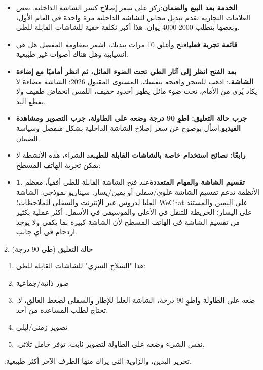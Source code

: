 \begin{itemize}
  \item \textbf{الخدمة بعد البيع والضمان}:ركز على سعر إصلاح كسر الشاشة الداخلية. بعض العلامات التجارية تقدم تبديل مجاني للشاشة الداخلية مرة واحدة في العام الأول، وبعضها يتطلب 2000-4000 يوان. هذا أكبر تكلفة خفية للشاشات القابلة للطي.
  \item \textbf{قائمة تجربة فعلي}افتح وأغلق 10 مرات بيديك، اشعر بمقاومة المفصل هل هي انسيابية وهل هناك أصوات غير طبيعية.
  \item \textbf{بعد الفتح انظر إلى آثار الطي تحت الضوء المائل، ثم انظر أماميًا مع إضاءة الشاشة.}: اذهب للمتجر وافتحه بنفسك. المستوى المقبول 2026: الشاشة مضاءة لا يكاد يُرى من الأمام، تحت ضوء مائل يظهر أخدود خفيف، اللمس انخفاض طفيف ولا يقطع اليد.
  \item \textbf{جرب حالة التعليق: اطوِ 90 درجة وضعه على الطاولة، جرب التصوير ومشاهدة الفيديو.}اسأل بوضوح عن سعر إصلاح الشاشة الداخلية بشكل منفصل وسياسة الضمان.
  \item \textbf{رابعًا: نصائح استخدام خاصة بالشاشات القابلة للطي}بعد الشراء، هذه الأنشطة لا يمكن تجربة الهاتف المسطح:
  \item \textbf{1. تقسيم الشاشة والمهام المتعددة}عند فتح الشاشة القابلة للطي أفقياً، معظم الأنظمة تدعم تقسيم الشاشة علوي/سفلي أو يمين/يسار. سيناريو نموذجي: الشاشة العليا لدروس عبر الإنترنت والسفلى للملاحظات؛ WeChat على اليمين والمستند على اليسار؛ الخريطة للتنقل في الأعلى والموسيقى في الأسفل. أكثر عملية بكثير من تقسيم الشاشة في الهاتف المسطح لأن الشاشة كبيرة بما يكفي ولا يوجد ازدحام في أي جانب.
\end{itemize}

\begin{tcbpractice}{2. حالة التعليق (طي 90 درجة)}
\begin{enumerate}
  \item هذا "السلاح السري" للشاشات القابلة للطي:
  \item صور ذاتية/جماعية
  \item :ضعه على الطاولة واطوِ 90 درجة، الشاشة العليا للإطار والسفلى لضغط الغالق، لا تحتاج لطلب المساعدة من أحد.
  \item تصوير زمني/ليلي
  \item :نفس الشيء وضعه على الطاولة لتصوير ثابت، توفر حامل ثلاثي.
\end{enumerate}

\end{tcbpractice}


:تحرير اليدين، والزاوية التي يراك منها الطرف الآخر أكثر طبيعية.

